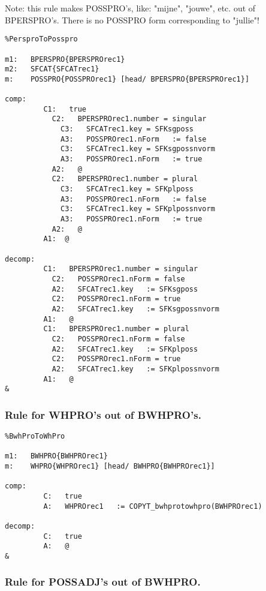 Note: this rule makes POSSPRO's, like: "mijne", "jouwe", etc. out of BPERSPRO's.
      There is no POSSPRO form corresponding to "jullie"!
\begin{verbatim}
%PersproToPosspro

m1:   BPERSPRO{BPERSPROrec1}
m2:   SFCAT{SFCATrec1}
m:    POSSPRO{POSSPROrec1} [head/ BPERSPRO{BPERSPROrec1}]

comp:    
         C1:   true
           C2:   BPERSPROrec1.number = singular
             C3:   SFCATrec1.key = SFKsgposs
             A3:   POSSPROrec1.nForm   := false
             C3:   SFCATrec1.key = SFKsgpossnvorm
             A3:   POSSPROrec1.nForm   := true
           A2:   @
           C2:   BPERSPROrec1.number = plural
             C3:   SFCATrec1.key = SFKplposs
             A3:   POSSPROrec1.nForm   := false
             C3:   SFCATrec1.key = SFKplpossnvorm
             A3:   POSSPROrec1.nForm   := true
           A2:   @
         A1:  @

decomp:  
         C1:   BPERSPROrec1.number = singular
           C2:   POSSPROrec1.nForm = false
           A2:   SFCATrec1.key   := SFKsgposs
           C2:   POSSPROrec1.nForm = true
           A2:   SFCATrec1.key   := SFKsgpossnvorm
         A1:   @
         C1:   BPERSPROrec1.number = plural
           C2:   POSSPROrec1.nForm = false
           A2:   SFCATrec1.key   := SFKplposs
           C2:   POSSPROrec1.nForm = true
           A2:   SFCATrec1.key   := SFKplpossnvorm
         A1:   @
&
\end{verbatim}
\newpage
\subsubsection{Rule for WHPRO's out of BWHPRO's.}

\begin{verbatim} 
%BwhProToWhPro

m1:   BWHPRO{BWHPROrec1}
m:    WHPRO{WHPROrec1} [head/ BWHPRO{BWHPROrec1}]

comp:    
         C:   true
         A:   WHPROrec1   := COPYT_bwhprotowhpro(BWHPROrec1)

decomp:  
         C:   true
         A:   @
&
\end{verbatim}
\newpage
\subsubsection{Rule for POSSADJ's out of BWHPRO.}

